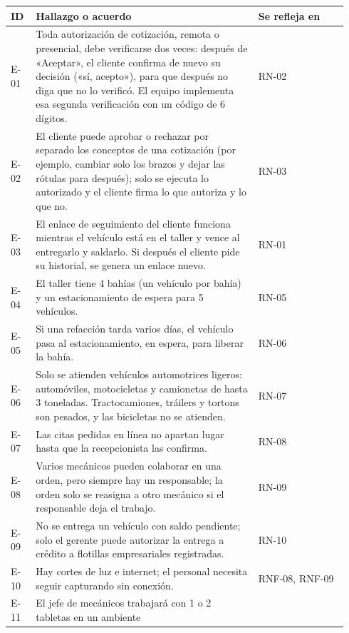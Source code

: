 {\small
\begin{longtable}[]{@{}
  >{\raggedright\arraybackslash}p{0.07\linewidth}
  >{\raggedright\arraybackslash}p{0.62\linewidth}
  >{\raggedright\arraybackslash}p{0.25\linewidth}@{}}
\toprule
\textbf{ID} & \textbf{Hallazgo o acuerdo} & \textbf{Se refleja en} \\
\midrule
\endhead
\bottomrule
\endlastfoot
E-01 & Toda autorización de cotización, remota o presencial, debe
verificarse dos veces: después de «Aceptar», el cliente confirma de nuevo
su decisión («sí, acepto»), para que después no diga que no lo verificó.
El equipo implementa esa segunda verificación con un código de 6
dígitos. & RN-02 \\
E-02 & El cliente puede aprobar o rechazar por separado los conceptos
de una cotización (por ejemplo, cambiar solo los brazos y dejar las
rótulas para después); solo se ejecuta lo autorizado y el cliente firma
lo que autoriza y lo que no. & RN-03 \\
E-03 & El enlace de seguimiento del cliente funciona mientras el vehículo
está en el taller y vence al entregarlo y saldarlo. Si después el
cliente pide su historial, se genera un enlace nuevo. & RN-01 \\
E-04 & El taller tiene 4 bahías (un vehículo por bahía) y un
estacionamiento de espera para 5 vehículos. & RN-05 \\
E-05 & Si una refacción tarda varios días, el vehículo pasa al
estacionamiento, en espera, para liberar la bahía. & RN-06 \\
E-06 & Solo se atienden vehículos automotrices ligeros: automóviles,
motocicletas y camionetas de hasta 3 toneladas. Tractocamiones, tráilers y
tortons son pesados, y las bicicletas no se atienden. & RN-07 \\
E-07 & Las citas pedidas en línea no apartan lugar hasta que la
recepcionista las confirma. & RN-08 \\
E-08 & Varios mecánicos pueden colaborar en una orden, pero siempre hay
un responsable; la orden solo se reasigna a otro mecánico si el
responsable deja el trabajo. & RN-09 \\
E-09 & No se entrega un vehículo con saldo pendiente; solo el gerente
puede autorizar la entrega a crédito a flotillas empresariales
registradas. & RN-10 \\
E-10 & Hay cortes de luz e internet; el personal necesita seguir
capturando sin conexión. & RNF-08, RNF-09 \\
E-11 & El jefe de mecánicos trabajará con 1 o 2 tabletas en un ambiente

\end{longtable}}
